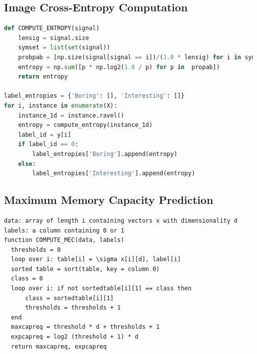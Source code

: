 \documentclass[12pt]{article}
\numberwithin{figure}{section} %
\begin{document}
\subsection{Image Cross-Entropy Computation}
\label{subsection:Image Cross-Entropy Computation}
\begin{lstlisting}[language = Python]
def COMPUTE_ENTROPY(signal)
    lensig = signal.size
    symset = list(set(signal))
    probpab = [np.size(signal[signal == i])/(1.0 * lensig) for i in symset]
    entropy = np.sum([p * np.log2(1.0 / p) for p in  propab])
    return entropy

label_entropies = {'Boring': [], 'Interesting': []}
for i, instance in enumerate(X):
    instance_1d = instance.ravel()
    entropy = compute_entropy(instance_1d)
    label_id = y[i]
    if label_id == 0:
        label_entropies['Boring'].append(entropy)
    else:
        label_entropies['Interesting'].append(entropy)
\end{lstlisting}

\subsection{Maximum Memory Capacity Prediction}
\label{subsection:Maximum Memory Capacity Prediction}
\begin{lstlisting}
data: array of length i containing vectors x with dimensionality d 
labels: a column containing 0 or 1
function COMPUTE_MEC(data, labels)
  thresholds = 0
  loop over i: table[i] = \sigma x[i][d], label[i]
  sorted table = sort(table, key = column 0) 
  class = 0
  loop over i: if not sortedtable[i][1] == class then 
      class = sortedtable[i][1]
      thresholds = thresholds + 1
  end
  maxcapreq = threshold * d + thresholds + 1
  expcapreq = log2 (threshold + 1) * d
  return maxcapreq, expcapreq
\end{lstlisting}
\end{document}
